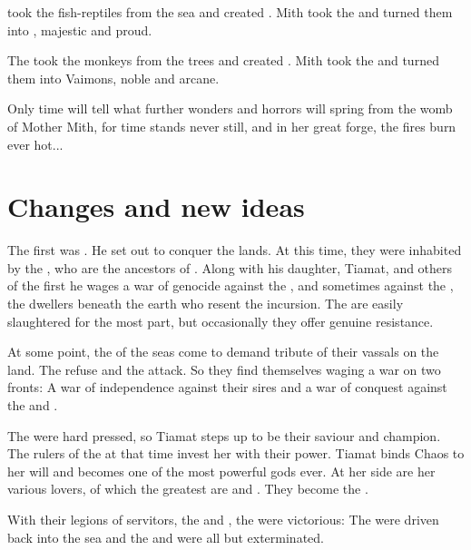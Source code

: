 \Moroch{} took the fish-reptiles from the sea and created \nagae{}. Mith took the \nagae{} and turned them into \dragons{}, majestic and proud. 

The \banes{} took the monkeys from the trees and created \humans{}. Mith took the \humans{} and turned them into Vaimons, noble and arcane. 

Only time will tell what further wonders and horrors will spring from the womb of Mother Mith, for time stands never still, and in her great forge, the fires burn ever hot... 



\section{Changes and new ideas}
The first \dragon{} was \HesodNerga{}. He set out to conquer the lands. At this time, they were inhabited by the \nephilim{}, who are the ancestors of \humans{}. Along with his daughter, Tiamat, and others of the first \dragons{} he wages a war of genocide against the \nephilim, and sometimes against the \Chthonians{}, the dwellers beneath the earth who resent the \draconic{} incursion. The \nephilim{} are easily slaughtered for the most part, but occasionally they offer genuine resistance. 

At some point, the \leviathans{} of the seas come to demand tribute of their vassals on the land. The \dragons{} refuse and the \nagae{} attack. So they find themselves waging a war on two fronts: A war of independence against their sires and a war of conquest against the \nephilim{} and \Chthonians{}. 


The \dragons{} were hard pressed, so Tiamat steps up to be their saviour and champion. The rulers of the \dragons{} at that time invest her with their power. Tiamat binds Chaos to her will and becomes one of the most powerful gods ever. At her side are her various lovers, of which the greatest are \ApepNesthra{} and \Iurzmacul{}. They become the \Dominators. 

With their legions of servitors, the \scathae{} and \cregorr{}, the \dragons{} were victorious: The \nagae{} were driven back into the sea and the \nephilim{} and \Chthonians{} were all but exterminated. 

